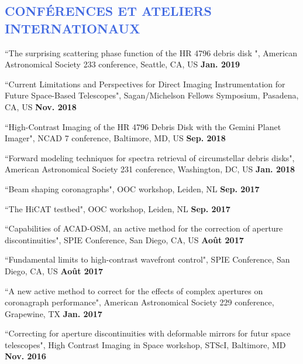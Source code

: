 \documentclass[11pt,a4paper, french]{article}
\begin{document}
\vspace{-0.8cm}
\textcolor{RoyalBlue}{\subsection{\large CONFÉRENCES ET ATELIERS INTERNATIONAUX}}

\begin{etaremune}

\item ``The surprising scattering phase function of the HR 4796 debris disk ", American Astronomical Society 233 conference, Seattle, CA, US \textbf{Jan. 2019}

\item ``Current Limitations and Perspectives for Direct Imaging Instrumentation for Future Space-Based Telescopes", Sagan/Michelson Fellows Symposium, Pasadena, CA, US \textbf{Nov. 2018}

\item ``High-Contrast Imaging of the HR 4796 Debris Disk with the Gemini Planet Imager", NCAD 7 conference, Baltimore, MD, US \textbf{Sep. 2018}

\item ``Forward modeling techniques for spectra retrieval of circumstellar debris disks", American Astronomical Society 231 conference, Washington, DC, US \textbf{Jan. 2018}

\item ``Beam shaping coronagraphs", OOC workshop, Leiden, NL \textbf{Sep. 2017}

\item ``The HiCAT testbed", OOC workshop, Leiden, NL \textbf{Sep. 2017}

\item ``Capabilities of ACAD-OSM, an active method for the correction of aperture discontinuities", SPIE Conference, San Diego, CA, US \textbf{Août 2017}

\item ``Fundamental limits to high-contrast wavefront control", SPIE Conference, San Diego, CA, US \textbf{Août 2017}

\item ``A new active method to correct for the effects of complex apertures on coronagraph performance", American Astronomical Society 229 conference, Grapewine, TX \textbf{Jan. 2017}

\item ``Correcting for aperture discontinuities with deformable mirrors for futur space telescopes", High Contrast Imaging in Space workshop, STScI, Baltimore, MD \textbf{Nov. 2016}


\end{etaremune}
\end{document}
